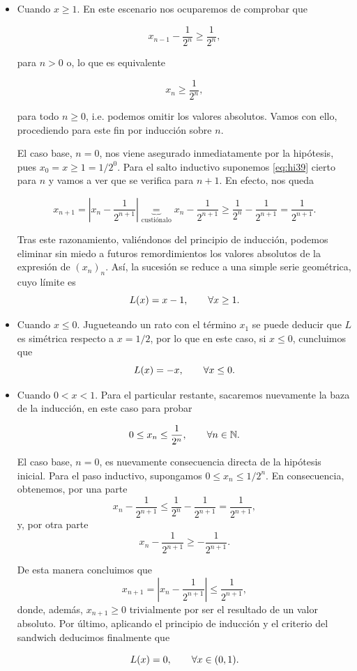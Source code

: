 \documentclass{article}
\begin{document}
\begin{itemize}
    \item Cuando $x \geq 1$. En este escenario nos ocuparemos de comprobar que

    \[x_{n-1} - \frac{1}{2^n} \geq \frac{1}{2^n},\]
    
    para $n > 0$ o, lo que es equivalente

    \begin{equation}
        x_{n} \geq \frac{1}{2^n},
        \label{eq:hi39}
    \end{equation}

    para todo $n \geq 0$, i.e. podemos omitir los valores absolutos. Vamos con ello, procediendo para este fin por inducción sobre $n$.

    El caso base, $n = 0$, nos viene asegurado inmediatamente por la hipótesis, pues $x_0 = x \geq 1 = 1/2^0$. Para el salto inductivo suponemos \eqref{eq:hi39} cierto para $n$ y vamos a ver que se verifica para $n + 1$. 
    En efecto, nos queda

    \[x_{n+1} = \left|x_n - \frac{1}{2^{n+1}}\right| \underbrace{=}_{\text{custiónalo}} x_n - \frac{1}{2^{n+1}} \geq \frac{1}{2^n} - \frac{1}{2^{n+1}} = \frac{1}{2^{n+1}}.\]

    Tras este razonamiento, valiéndonos del principio de inducción, podemos eliminar sin miedo a futuros remordimientos los valores absolutos de la expresión de $(x_n)_n$. Así, la sucesión se reduce a una simple serie geométrica, cuyo límite es \[L(x) = x - 1, \hspace{20px} \forall x \geq 1.\]

    \item Cuando $x \leq 0$. Jugueteando un rato con el término $x_1$ se puede deducir que $L$ es simétrica respecto a $x = 1/2$, por lo que en este caso, si $x \leq 0$, cuncluimos que \[L(x) = -x, \hspace{20px} \forall x \leq 0.\]
    
    \item Cuando $0 < x < 1$. Para el particular restante, sacaremos nuevamente la baza de la inducción, en este caso para probar
    
    \[0 \leq x_n \leq \frac{1}{2^n}, \hspace{20px} \forall n \in \mathbb{N}.\]

    El caso base, $n = 0$, es nuevamente consecuencia directa de la hipótesis inicial. 
    Para el paso inductivo, supongamos $0 \leq x_n \leq 1/2^n$. En consecuencia, obtenemos, por una parte \[x_n - \frac{1}{2^{n+1}} \leq \frac{1}{2^n} - \frac{1}{2^{n+1}} = \frac{1}{2^{n+1}},\] y, por otra parte \[x_n - \frac{1}{2^{n+1}} \geq -\frac{1}{2^{n+1}}.\]

    De esta manera concluimos que \[x_{n+1} = \left|x_n - \frac{1}{2^{n+1}}\right| \leq \frac{1}{2^{n+1}},\] donde, además, $x_{n+1} \geq 0$ trivialmente por ser el resultado de un valor absoluto. Por último, aplicando el principio de inducción y el criterio del sandwich deducimos finalmente que

    \[L(x) = 0, \hspace{20px} \forall x \in (0, 1).\]
\end{itemize}
\end{document}
